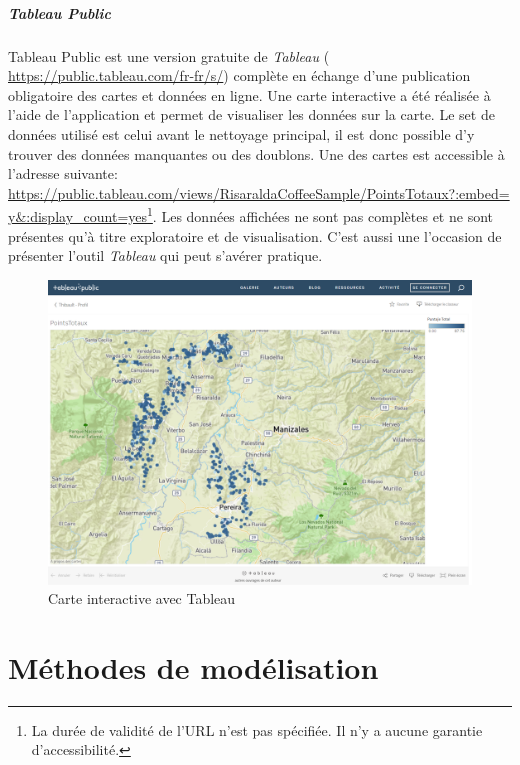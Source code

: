 \paragraph{Tableau Public} Tableau Public est une version gratuite de \textit{Tableau} (\url{
	https://public.tableau.com/fr-fr/s/}) complète en échange d'une publication obligatoire des cartes et données en ligne. Une carte interactive a été réalisée à l'aide de l'application et permet de visualiser les données sur la carte. Le set de données utilisé est celui avant le nettoyage principal, il est donc possible d'y trouver des données manquantes ou des doublons. Une des cartes est accessible à l'adresse suivante: \url{https://public.tableau.com/views/RisaraldaCoffeeSample/PointsTotaux?:embed=y&:display_count=yes}\footnote{La durée de validité de l'URL n'est pas spécifiée. Il n'y a aucune garantie d'accessibilité.}. Les données affichées ne sont pas complètes et ne sont présentes qu'à titre exploratoire et de visualisation. C'est aussi une l'occasion de présenter l'outil \textit{Tableau} qui peut s'avérer pratique.



\begin{figure}[H]
	\centering
	\includegraphics[width=1\linewidth]{img/tableauOnline}
	\caption{Carte interactive avec Tableau}
	\label{fig:tableauonline}
\end{figure}






\chapter{Méthodes de modélisation}
